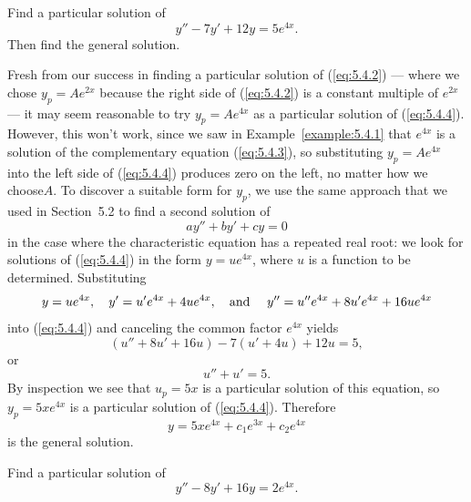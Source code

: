 \begin{example}
  \label{example:5.4.2} \rm Find a particular solution of
  \begin{equation}
    \label{eq:5.4.4}y''-7y'+12y=5e^{4x}.
  \end{equation}
  Then find the general solution.
\end{example}

\begin{examplesolution}
\solution Fresh from our success in finding a particular solution of (\ref{eq:5.4.2}) --- where we
chose $y_{p}=Ae^{2x}$ because the right side of (\ref{eq:5.4.2}) is a constant multiple of $e^{2x}$
--- it may seem reasonable to try $y_{p}=Ae^{4x}$ as a particular solution of (\ref{eq:5.4.4}).
However, this won't work, since we saw in Example~\ref{example:5.4.1} that $e^{4x}$ is a solution of
the complementary equation (\ref{eq:5.4.3}), so substituting $y_{p}=Ae^{4x}$ into the left side of
(\ref{eq:5.4.4}) produces zero on the left, no matter how we choose$A$. To discover a suitable form
for $y_{p}$, we use the same approach that we used in Section~5.2 to find a second solution of
\[
  ay''+by'+cy=0
\]
in the case where the characteristic equation has a repeated real root: we look for solutions of
(\ref{eq:5.4.4}) in the form $y=ue^{4x}$, where $u$ is a function to be determined. Substituting
\begin{equation}
  \label{eq:5.4.5}y=ue^{4x},\quad y'=u'e^{4x}+4ue^{4x},\mbox{\quad and \quad}y''=u''e^{4x}+8u'e^{4x}+16ue^{4x}
\end{equation}
into (\ref{eq:5.4.4}) and canceling the common factor $e^{4x}$ yields
\[
  (u''+8u'+16u)-7(u'+4u)+12u=5,
\]
or
\[
  u''+u'=5.
\]
By inspection we see that $u_{p}=5x$ is a particular solution of this equation, so $y_{p}=5xe^{4x}$
is a particular solution of (\ref{eq:5.4.4}). Therefore
\[
  y=5xe^{4x}+c_{1}e^{3x}+c_{2}e^{4x}
\]
is the general solution.
\end{examplesolution}

\begin{example}
  \label{example:5.4.3} \rm Find a particular solution of
  \begin{equation}
    \label{eq:5.4.6}y''-8y'+16y=2e^{4x}.
  \end{equation}
\end{example}

